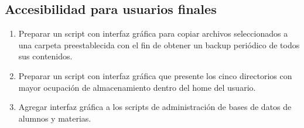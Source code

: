 \subsection{Accesibilidad para usuarios finales}
\begin{enumerate}
	\item 
Preparar un script con interfaz gráfica para copiar archivos seleccionados a una carpeta preestablecida con el fin de obtener un backup periódico de todos sus contenidos.
	\item 
Preparar un script con interfaz gráfica que presente los cinco directorios con mayor ocupación de almacenamiento dentro del home del usuario.
	\item 
Agregar interfaz gráfica a los scripts de administración de bases de datos de alumnos y materias.
\end{enumerate}

